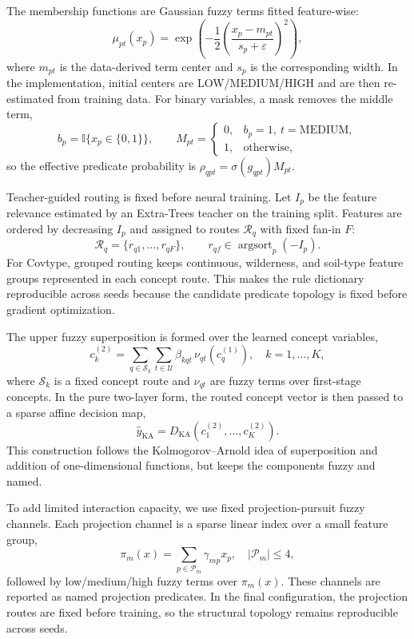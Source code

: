 \documentclass[runningheads]{llncs}
\begin{document}
The membership functions are Gaussian fuzzy terms fitted feature-wise:
\[
\mu_{pt}(x_p)=
\exp\!\left(
-\frac{1}{2}
\left(
\frac{x_p-m_{pt}}{s_p+\varepsilon}
\right)^2
\right),
\]
where $m_{pt}$ is the data-derived term center and $s_p$ is the corresponding width. In the implementation, initial centers are LOW/MEDIUM/HIGH and are then re-estimated from training data. For binary variables, a mask removes the middle term,
\[
b_p=\mathbb{I}\{x_p\in\{0,1\}\},\qquad
M_{pt} =
\begin{cases}
0, & b_p=1,\ t=\mathrm{MEDIUM},\\
1, & \text{otherwise},
\end{cases}
\]
so the effective predicate probability is $\rho_{qpt}=\sigma(g_{qpt})M_{pt}$.

Teacher-guided routing is fixed before neural training. Let $I_p$ be the feature relevance estimated by an Extra-Trees teacher on the training split. Features are ordered by decreasing $I_p$ and assigned to routes $\mathcal{R}_q$ with fixed fan-in $F$:
\[
\mathcal{R}_q =
\{r_{q1},\dots,r_{qF}\},\qquad
r_{qf}\in\operatorname{argsort}_{p}(-I_p).
\]
For Covtype, grouped routing keeps continuous, wilderness, and soil-type feature groups represented in each concept route. This makes the rule dictionary reproducible across seeds because the candidate predicate topology is fixed before gradient optimization.

The upper fuzzy superposition is formed over the learned concept variables,
\[
c_k^{(2)} =
\sum_{q\in \mathcal{S}_k}
\sum_{t\in \mathcal{U}}
\beta_{kqt}\,\nu_{qt}\!\left(c_q^{(1)}\right),
\quad k=1,\dots,K,
\]
where $\mathcal{S}_k$ is a fixed concept route and $\nu_{qt}$ are fuzzy terms over first-stage concepts. In the pure two-layer form, the routed concept vector is then passed to a sparse affine decision map,
\[
\hat{y}_{\mathrm{KA}} =
D_{\mathrm{KA}}\!\left(c_1^{(2)},\dots,c_K^{(2)}\right).
\]
This construction follows the Kolmogorov--Arnold idea of superposition and addition of one-dimensional functions, but keeps the components fuzzy and named.

To add limited interaction capacity, we use fixed projection-pursuit fuzzy channels. Each projection channel is a sparse linear index over a small feature group,
\[
\pi_m(x)=
\sum_{p\in \mathcal{P}_m} \gamma_{mp}x_p,
\quad |\mathcal{P}_m|\le 4,
\]
followed by low/medium/high fuzzy terms over $\pi_m(x)$. These channels are reported as named projection predicates. In the final configuration, the projection routes are fixed before training, so the structural topology remains reproducible across seeds.
\end{document}
